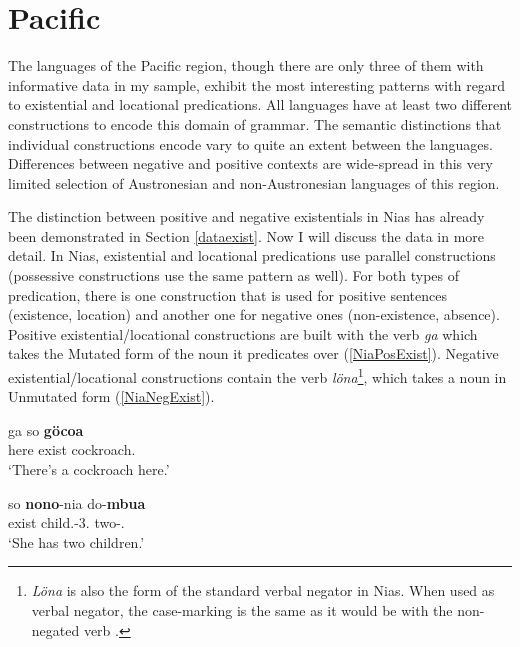 \section{Pacific}\label{ExistOc}

The languages of the Pacific region, though there are only three of them with informative data in my sample, exhibit the most interesting patterns with regard to existential and locational predications.
All languages have at least two different constructions to encode this domain of grammar. 
The semantic distinctions that individual constructions encode vary to quite an extent between the languages. 
Differences between negative and positive contexts are wide-spread in this very limited selection of Austronesian and non-Austronesian languages of this region. 

The distinction between positive and negative existentials in Nias has already been demonstrated in Section \ref{dataexist}.
Now I will discuss the data in more detail.
In Nias, existential and locational predications use parallel constructions (possessive constructions use the same pattern as well).
For both types of predication, there is one construction that is used for positive sentences (existence, location) and another one for negative ones (non-existence, absence).
Positive existential/locational constructions are built with the verb \emph{ga} which takes the Mutated form of the noun it predicates over (\ref{NiaPosExist}).  
Negative existential/locational constructions contain the verb \emph{l\"ona}\footnote{\textit{Löna} is also the form of the standard verbal negator in Nias.  
When used as verbal negator, the case-marking is the same as it would be with the non-negated verb \citep[471--475]{Brown:2001}.}, which takes a noun in Unmutated form (\ref{NiaNegExist}).

\begin{exe} \ex\label{NiaPosExist}
\begin{xlist} \ex \gll ga so \textbf{g\"ocoa}\\
here exist cockroach.\mut{}\\
\glt `There's a cockroach here.'

\ex \gll so \textbf{nono}-nia do-\textbf{mbua}\\
exist child.\mut{}-3\sg{}.\poss{} two-\clf{}.\mut{}\\
\glt `She has two children.'
\end{xlist}
\end{exe}

